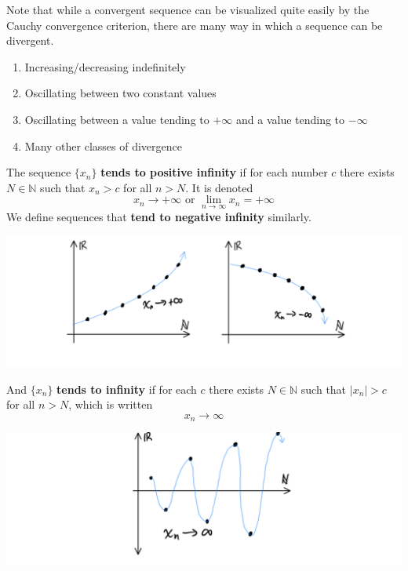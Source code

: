 \documentclass{article}
\begin{document}
      Note that while a convergent sequence can be visualized quite easily by the Cauchy convergence criterion, there are many way in which a sequence can be divergent. 
      \begin{enumerate}
        \item Increasing/decreasing indefinitely
        \item Oscillating between two constant values
        \item Oscillating between a value tending to $+\infty$ and a value tending to $-\infty$
        \item Many other classes of divergence
      \end{enumerate}

      \begin{definition}
        The sequence $\{x_n\}$ \textbf{tends to positive infinity} if for each number $c$ there exists $N \in \mathbb{N}$ such that $x_n > c$ for all $n > N$. It is denoted 
        \[x_n \rightarrow + \infty \text{ or } \lim_{n \rightarrow \infty} x_n = + \infty\]
        We define sequences that \textbf{tend to negative infinity} similarly. 
        \begin{center}
            \includegraphics[scale=0.25]{img/Positive_Negative_Infinity.PNG}
        \end{center}
        And $\{x_n\}$ \textbf{tends to infinity} if for each $c$ there exists $N \in \mathbb{N}$ such that $|x_n| > c$ for all $n > N$, which is written 
        \[x_n \rightarrow \infty\]
        \begin{center}
            \includegraphics[scale=0.25]{img/Tending_to_Infinity.PNG}
        \end{center}
      \end{definition}
\end{document}
